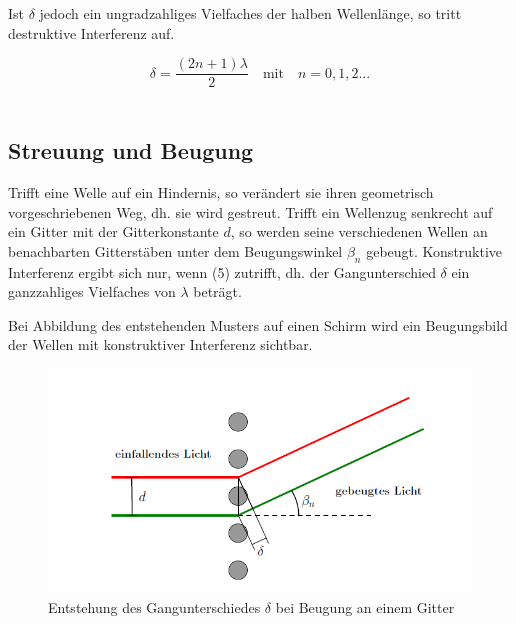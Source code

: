 \documentclass[12pt,a4paper,titlepage,headinclude,bibtotoc]{scrartcl}
\begin{document}
Ist $\delta$ jedoch ein ungradzahliges Vielfaches der halben Wellenlänge, so tritt destruktive Interferenz auf. \\
\par
\begin{equation}
\delta = \frac{(2n+1)\lambda}{2} \quad \mathrm{mit}\quad  n=0,1,2...
\end{equation}
\\
\par


\subsection{Streuung und Beugung}
Trifft eine Welle auf ein Hindernis, so verändert sie ihren geometrisch vorgeschriebenen Weg, dh. sie wird gestreut. %
Trifft ein Wellenzug senkrecht auf ein Gitter mit der Gitterkonstante $d$, so werden seine verschiedenen Wellen an benachbarten Gitterstäben unter dem Beugungswinkel $\beta_n$ gebeugt. Konstruktive Interferenz ergibt sich nur, wenn (5) zutrifft, dh. der Gangunterschied $\delta$ ein ganzzahliges Vielfaches von $\lambda$ beträgt.

Bei Abbildung des entstehenden Musters auf einen Schirm wird ein Beugungsbild der Wellen mit konstruktiver Interferenz sichtbar.

\begin{figure} [h]
\begin{center}
\includegraphics[scale=0.75]{Gangunterschied.png} \end{center}
\caption{Entstehung des Gangunterschiedes $\delta$ bei Beugung an einem Gitter}
\end{figure}
\end{document}
